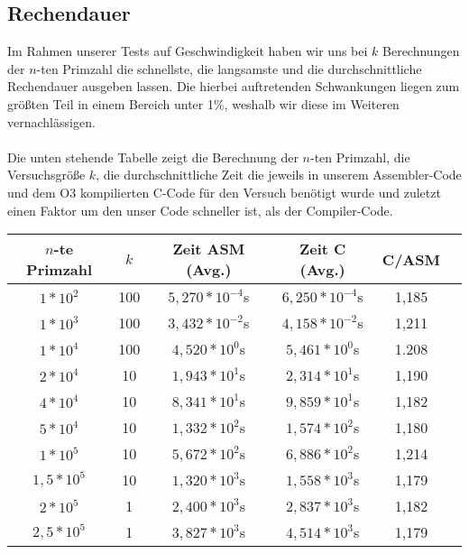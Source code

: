 \documentclass[11pt]{scrartcl}
\begin{document}
\subsection{Rechendauer}
\label{Rechendauer}

Im Rahmen unserer Tests auf Geschwindigkeit haben wir uns bei $k$ Berechnungen der $n$-ten Primzahl die schnellste, die langsamste und die durchschnittliche Rechendauer ausgeben lassen. Die hierbei auftretenden Schwankungen liegen zum größten Teil in einem Bereich unter 1\%, weshalb wir diese im Weiteren vernachlässigen. 

\paragraph{}

Die unten stehende Tabelle zeigt die Berechnung der $n$-ten Primzahl, die Versuchsgröße $k$, die durchschnittliche Zeit die jeweils in unserem Assembler-Code und dem O3 kompilierten C-Code für den Versuch benötigt wurde und zuletzt einen Faktor um den unser Code schneller ist, als der Compiler-Code.

\begin{center}
\begin{tabular}{| c | c | c | c | c | p{15cm}}
\hline
    $n$-te Primzahl & $k$ & Zeit ASM (Avg.) & Zeit C (Avg.) & C/ASM \\ \hline
    $1 * 10^2$ & 100 & $5,270 *10^{-4}$s & $6,250*10^{-4}$s & 1,185\\
    $1 * 10^3$ & 100 & $3,432 * 10^{-2}$s & $4,158 *10^{-2}$s & 1,211\\
    $1 * 10^4$ & 100 & $4,520 * 10^0$s & $5,461 * 10^0$s & 1.208\\
    $2 * 10^4$ & 10 & $1,943 * 10^1$s & $2,314 * 10^1$s & 1,190\\
    $4 * 10^4$ & 10 & $8,341 * 10^1$s & $9,859 * 10^1$s & 1,182\\
    $5 * 10^4$ & 10 & $1,332 * 10^2$s & $1,574 * 10^2$s & 1,180\\
    $1 * 10^5$ & 10 & $5,672 * 10^2$s & $6,886 * 10^2$s & 1,214\\
    $1,5 * 10^5$ & 10 & $1,320 * 10^3$s & $1,558 * 10^3$s & 1,179\\
    $2 * 10^5$ & 1 & $2,400 * 10^3$s & $2,837 * 10 ^3$s & 1,182\\
    $2,5 * 10^5$ & 1 & $3,827 * 10^3$s & $4,514 * 10^3$s & 1,179\\
    \hline
\end{tabular}
\end{center}
\end{document}
